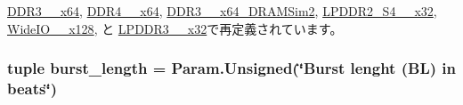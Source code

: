 \hyperlink{classDRAMCtrl_1_1DDR3__1600__x64_ac43360fda587200e99a090d69163e089}{DDR3\_\_\-x64}, \hyperlink{classDRAMCtrl_1_1DDR4__2400__x64_ac43360fda587200e99a090d69163e089}{DDR4\_\_\-x64}, \hyperlink{classDRAMCtrl_1_1DDR3__1333__x64__DRAMSim2_ac43360fda587200e99a090d69163e089}{DDR3\_\_\-x64\_\-DRAMSim2}, \hyperlink{classDRAMCtrl_1_1LPDDR2__S4__1066__x32_ac43360fda587200e99a090d69163e089}{LPDDR2\_\-S4\_\_\-x32}, \hyperlink{classDRAMCtrl_1_1WideIO__200__x128_ac43360fda587200e99a090d69163e089}{WideIO\_\_\-x128}, と \hyperlink{classDRAMCtrl_1_1LPDDR3__1600__x32_ac43360fda587200e99a090d69163e089}{LPDDR3\_\_\-x32}で再定義されています。\hypertarget{classDRAMCtrl_1_1DRAMCtrl_a515af56f26521d738587f488ea98a63b}{
\subsubsection[{burst\_\-length}]{\setlength{\rightskip}{0pt plus 5cm}tuple {\bf burst\_\-length} = Param.Unsigned(\char`\"{}Burst lenght (BL) in beats\char`\"{})}}
\label{classDRAMCtrl_1_1DRAMCtrl_a515af56f26521d738587f488ea98a63b}



